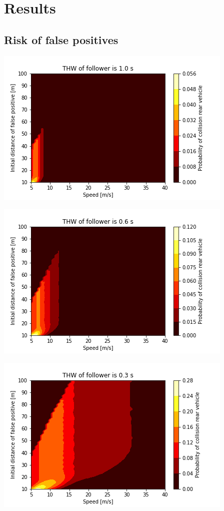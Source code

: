 \section{Results}
\label{sec:results}




\subsection{Risk of false positives}
\label{sec:results false negatives}


\includegraphics[width=.9\linewidth]{figures/fp_prob_10_100_5_40_10.png}

\includegraphics[width=.9\linewidth]{figures/fp_prob_10_100_5_40_06.png}

\includegraphics[width=.9\linewidth]{figures/fp_prob_10_100_5_40_03.png}

